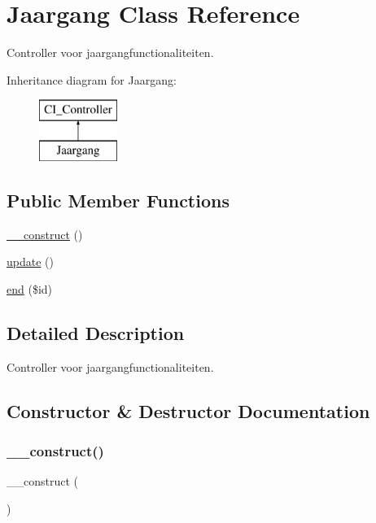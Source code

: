 \hypertarget{class_jaargang}{}\section{Jaargang Class Reference}
\label{class_jaargang}


Controller voor jaargangfunctionaliteiten.  


Inheritance diagram for Jaargang\+:\begin{figure}[H]
\begin{center}
\leavevmode
\includegraphics[height=2.000000cm]{class_jaargang}
\end{center}
\end{figure}
\subsection*{Public Member Functions}
\begin{DoxyCompactItemize}
\item 
\mbox{\hyperlink{class_jaargang_a095c5d389db211932136b53f25f39685}{\+\_\+\+\_\+construct}} ()
\item 
\mbox{\hyperlink{class_jaargang_a842e4774e3b3601a005b995c02f7e883}{update}} ()
\item 
\mbox{\hyperlink{class_jaargang_a96b12cad9ede16ef3e87c74cf77b894b}{end}} (\$id)
\end{DoxyCompactItemize}


\subsection{Detailed Description}
Controller voor jaargangfunctionaliteiten. 

\subsection{Constructor \& Destructor Documentation}
\mbox{\label{class_jaargang_a095c5d389db211932136b53f25f39685}} 
\subsubsection{\texorpdfstring{\+\_\+\+\_\+construct()}{\_\_construct()}}
{\footnotesize\ttfamily \+\_\+\+\_\+construct (\begin{DoxyParamCaption}{ }\end{DoxyParamCaption})}

